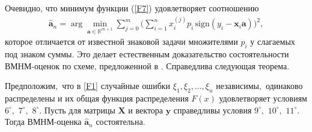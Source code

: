 Очевидно, что минимум функции (\ref{F7}) удовлетворяет
соотношению 
\begin{gather} \label{F8}
\mathbf{\hat{a}}_{n}=\arg\min _{\mathbf{a} \in \mathbb{R}^{m+1}}
\sum_{j=0}^m \biggl (\sum_{i=1}^n x_{i}^{(j)}p_{i} \,
\mathrm{sign}\left(y_{i}-\mathbf{x}_{i}\mathbf{a}\right)\biggr)^{2},
\end{gather} 
которое отличается от известной знаковой задачи
{\cite[c.~69]{fourth}} %
множителями $p_{i}$ у слагаемых под знаком суммы. Это делает
естественным доказательство состоятельности ВМНМ-оценок по схеме,
предложенной в {\cite{fourth}}. Справедлива следующая теорема.

\begin{theorem}[2]\label{th:3}Предположим$,$ что в \eqref{F1} случайные ошибки $\xi_{1},  \xi_{2}, \ldots,\xi_{n}$ не\-за\-ви\-симы$,$ одинаково
распределены и их общая функция распределения $F(x)$ удовлетворяет условиям $6^{\circ},$ $7^{\circ},$ $8^{\circ}.$ 
Пусть для матрицы $\mathbf{X}$ и вектора $\mathbf{y}$ справедливы условия 
$9^{\circ},$ $10^{\circ},$ $11^{\circ}.$ Тогда ВМНМ-оценка $\mathbf{\hat{a}}_{n}$ состоятельна$.$
\end{theorem}

